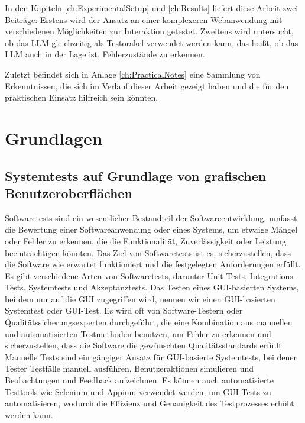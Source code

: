 In den Kapiteln \ref{ch:ExperimentalSetup} und \ref{ch:Results} liefert diese Arbeit zwei Beiträge:
Erstens wird der Ansatz an einer komplexeren Webanwendung mit verschiedenen Möglichkeiten zur Interaktion getestet.
Zweitens wird untersucht, ob das LLM gleichzeitig als Testorakel verwendet werden kann, das heißt, ob das LLM auch in der Lage ist, Fehlerzustände zu erkennen.


Zuletzt befindet sich in Anlage \ref{ch:PracticalNotes} eine Sammlung von Erkenntnissen, die sich im Verlauf dieser Arbeit gezeigt haben und die für den praktischen Einsatz hilfreich sein könnten.



\chapter{Grundlagen}
\label{ch:Foundations}

\section{Systemtests auf Grundlage von grafischen Benutzeroberflächen}
\label{sec:Foundations:GUIBasedSystemTests}
Softwaretests sind ein wesentlicher Bestandteil der Softwareentwicklung.
 umfasst die Bewertung einer Softwareanwendung oder eines Systems, um etwaige Mängel oder Fehler zu erkennen, die die Funktionalität, Zuverlässigkeit oder Leistung beeinträchtigen könnten.
Das Ziel von Softwaretests ist es, sicherzustellen, dass die Software wie erwartet funktioniert und die festgelegten Anforderungen erfüllt.
Es gibt verschiedene Arten von Softwaretests, darunter Unit-Tests, Integrations-Tests, Systemtests und Akzeptanztests.
Das Testen eines GUI-basierten Systems, bei dem nur auf die GUI zugegriffen wird, nennen wir einen GUI-basierten Systemtest oder GUI-Test.
Es wird oft von Software-Testern oder Qualitätssicherungsexperten durchgeführt, die eine Kombination aus manuellen und automatisierten Testmethoden benutzen, um Fehler zu erkennen und sicherzustellen, dass die Software die gewünschten Qualitätsstandards erfüllt.
Manuelle Tests sind ein gängiger Ansatz für GUI-basierte Systemtests, bei denen Tester Testfälle manuell ausführen, Benutzeraktionen simulieren und Beobachtungen und Feedback aufzeichnen.
Es können auch automatisierte Testtools wie Selenium und Appium verwendet werden, um GUI-Tests zu automatisieren, wodurch die Effizienz und Genauigkeit des Testprozesses erhöht werden kann.

